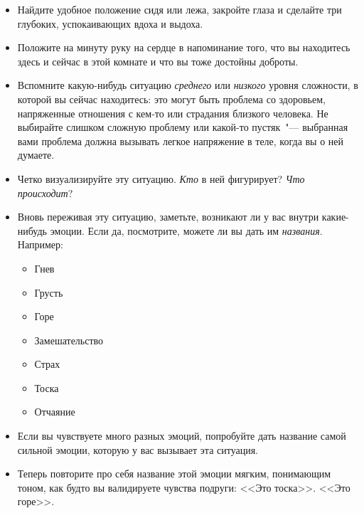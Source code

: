 \begin{itemize}
	\item Найдите удобное положение сидя или лежа, закройте глаза и сделайте три глубоких, успокаивающих вдоха и выдоха.
	
	\item Положите на минуту руку на сердце в напоминание того, что вы находитесь здесь и сейчас в этой комнате и что вы тоже достойны доброты.
	
	\item Вспомните какую-нибудь ситуацию \emph{среднего} или \emph{низкого} уровня сложности, в которой вы сейчас находитесь: это могут быть проблема со здоровьем, напряженные отношения с кем-то или страдания близкого человека. Не выбирайте слишком сложную проблему или какой-то пустяк~"--- выбранная вами проблема должна вызывать легкое напряжение в теле, когда вы о ней думаете.
	
	\item Четко визуализируйте эту ситуацию. \emph{Кто} в ней фигурирует? \emph{Что происходит}?
\end{itemize}

\vspace{2ex}

\begin{itemize}
	\item Вновь переживая эту ситуацию, заметьте, возникают ли у вас внутри какие-нибудь эмоции. Если да, посмотрите, можете ли вы дать им \emph{названия}. Например:	
	\begin{itemize}
		\item Гнев
		\item Грусть
		\item Горе
		\item Замешательство
		\item Страх
		\item Тоска
		\item Отчаяние
	\end{itemize}

	\item Если вы чувствуете много разных эмоций, попробуйте дать название самой сильной эмоции, которую у вас вызывает эта ситуация. 
	
	\item Теперь повторите про себя название этой эмоции мягким, понимающим тоном, как будто вы валидируете чувства подруги: <<Это тоска>>. <<Это горе>>.
\end{itemize}

